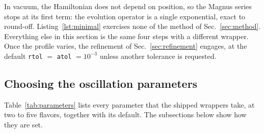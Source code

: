 \documentclass[final,5p,times,twocolumn,sort,compress]{elsarticle}
\makeatletter
\DeclareRobustCommand{\_}{%
  \ifmmode\nfss@text{\textunderscore}\else\textunderscore\allowbreak\fi}
\newcommand{\Tab}{Table}
\newcommand{\tabl}[1]{\Tab~\ref{tab:#1}}
\makeatother
\begin{document}
In vacuum, the Hamiltonian does not depend on position, so the Magnus series stops at its first term: the evolution operator is a single exponential, exact to round-off. Listing~\ref{lst:minimal} exercises none of the method of Sec.~\ref{sec:method}. Everything else in this section is the same four steps with a different wrapper. Once the profile varies, the refinement of Sec.~\ref{sec:refinement} engages, at the default {\tt rtol} $=$ {\tt atol} $= 10^{-3}$ unless another tolerance is requested.


\subsection{Choosing the oscillation parameters}
\label{sec:params}

\tabl{parameters} lists every parameter that the shipped wrappers take, at two to five flavors, together with its default. The subsections below show how they are set.

\end{document}
